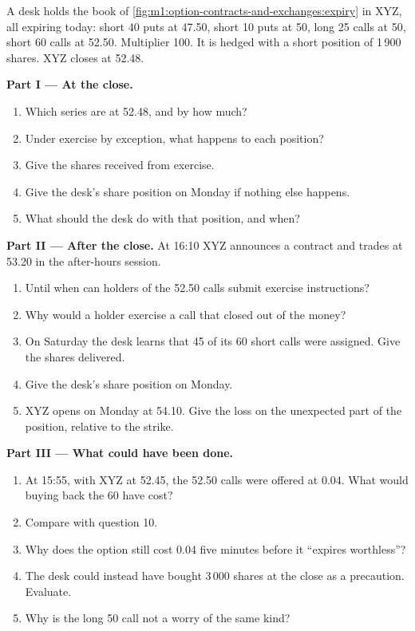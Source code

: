 \begin{problem}\label{pb:m1:option-contracts-and-exchanges:1}
A desk holds the book of \cref{fig:m1:option-contracts-and-exchanges:expiry}
in XYZ, all expiring today: short 40 puts at 47.50, short 10 puts at 50, long
25 calls at 50, short 60 calls at 52.50. Multiplier 100. It is hedged with a
short position of 1\,900 shares. XYZ closes at 52.48.

\medskip\noindent\textbf{Part I --- At the close.}
\begin{enumerate}
\item Which series are  at 52.48, and by how much?
\item Under exercise by exception, what happens to each position?
\item Give the shares received from exercise.
\item Give the desk's share position on Monday if nothing else happens.
\item What should the desk do with that position, and when?
\end{enumerate}

\medskip\noindent\textbf{Part II --- After the close.}
At 16:10 XYZ announces a contract and trades at 53.20 in the after-hours
session.
\begin{enumerate}[resume]
\item Until when can holders of the 52.50 calls submit exercise
instructions?
\item Why would a holder exercise a call that closed out of the money?
\item On Saturday the desk learns that 45 of its 60 short calls were
assigned. Give the shares delivered.
\item Give the desk's share position on Monday.
\item XYZ opens on Monday at 54.10. Give the loss on the unexpected part of
the position, relative to the strike.
\end{enumerate}

\medskip\noindent\textbf{Part III --- What could have been done.}
\begin{enumerate}[resume]
\item At 15:55, with XYZ at 52.45, the 52.50 calls were offered at 0.04. What
would buying back the 60 have cost?
\item Compare with question 10.
\item Why does the option still cost 0.04 five minutes before it
``expires worthless''?
\item The desk could instead have bought 3\,000 shares at the close as a
precaution. Evaluate.
\item Why is the long 50 call not a worry of the same kind?
\end{enumerate}


\end{problem}
